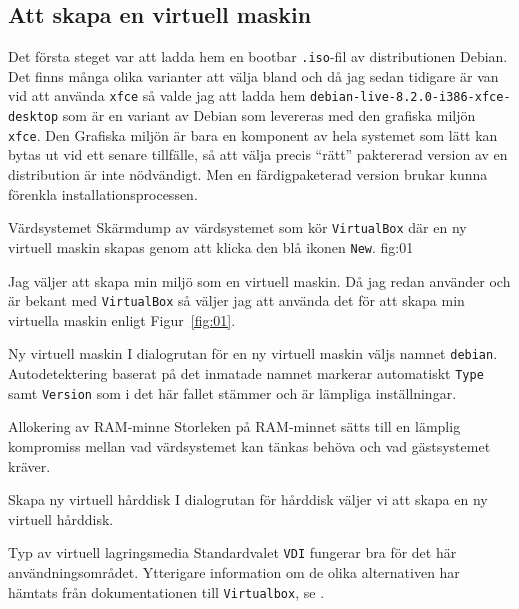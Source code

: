 \subsection{Att skapa en virtuell maskin}
Det första steget var att ladda hem en bootbar \texttt{.iso}-fil av
distributionen Debian. Det finns många olika varianter att välja bland och då
jag sedan tidigare är van vid att använda \texttt{xfce} så valde jag att ladda
hem \texttt{debian-live-8.2.0-i386-xfce-desktop} som är en variant av Debian
som levereras med den grafiska miljön \texttt{xfce}. Den Grafiska miljön är
bara en komponent av hela systemet som lätt kan bytas ut vid ett senare
tillfälle, så att välja precis ``rätt'' paktererad version av en distribution
är inte nödvändigt.  Men en färdigpaketerad version brukar kunna förenkla
installationsprocessen.

           {Värdsystemet}
           {Skärmdump av värdsystemet som kör \texttt{VirtualBox} där en ny
            virtuell maskin skapas genom att klicka den blå ikonen
            \texttt{New}.}
           {fig:01}

Jag väljer att skapa min miljö som en virtuell maskin. Då jag redan använder
och är bekant med \texttt{VirtualBox} så väljer jag att använda det för att
skapa min virtuella maskin enligt Figur~\ref{fig:01}.

           {Ny virtuell maskin}
           {I dialogrutan för en ny virtuell maskin väljs namnet
            \texttt{debian}. Autodetektering baserat på det inmatade
            namnet markerar automatiskt \texttt{Type} samt \texttt{Version}
            som i det här fallet stämmer och är lämpliga inställningar.}
           {}

           {Allokering av RAM-minne}
           {Storleken på RAM-minnet sätts till en lämplig kompromiss mellan
            vad värdsystemet kan tänkas behöva och vad gästsystemet kräver.}
           {}

           {Skapa ny virtuell hårddisk}
           {I dialogrutan för hårddisk väljer vi att skapa en ny virtuell
            hårddisk.}
           {}

           {Typ av virtuell lagringsmedia}
           {Standardvalet \texttt{VDI} fungerar bra för det här
            användningsområdet. Ytterigare information om de olika alternativen
            har hämtats från dokumentationen till \texttt{Virtualbox},
            se \cite{virtualbox:vdidetails}.}
           {}

